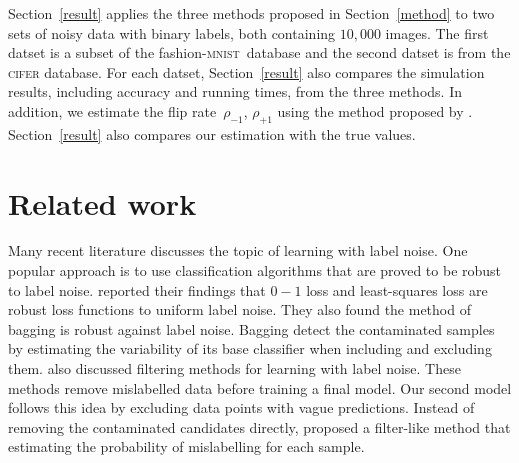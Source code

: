 \documentclass[12pt]{article} %
\newcommand{\rhoo}{\rho_{+1}}
\newcommand{\rhoz}{\rho_{-1}}
\newcommand{\mnist}{fashion-\textsc{mnist}}
\begin{document}
Section~\ref{result} applies the three methods proposed in Section~\ref{method} to two sets of noisy data with binary labels, both containing $10,000$ images. The first datset is a subset of the \mnist\ database and the second datset is from the \textsc{cifer} database. For each datset, Section~\ref{result} also compares the simulation results, including accuracy and running times, from the three methods. In addition, we estimate the flip rate~$\rhoz$, $\rhoo$ using the method proposed by \citet{liu2016classification}.
Section~\ref{result} also compares our estimation with the true values.
\section{Related work}
Many recent literature discusses the topic of learning with label noise. One popular approach is to use classification algorithms that are proved to be robust to label noise. \citet{frenay2014classification} reported their findings that $0-1$ loss and least-squares loss are robust loss functions to uniform label noise. %
They also found the method of bagging is robust against label noise. Bagging detect the contaminated samples by estimating the variability of its base classifier when including and excluding them. %
\citet{frenay2014classification} also discussed filtering methods for learning with label noise. These methods remove mislabelled data before training a final model. Our second model follows this idea by excluding data points with vague predictions. Instead of removing the contaminated candidates directly, \citet{yang2018adasampling} proposed a filter-like method that estimating the probability of mislabelling for each sample.
\end{document}
